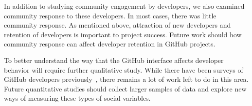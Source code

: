 \documentclass{iitthesis}
\begin{document}
In addition to studying community engagement by developers, we also examined
community response to these developers. In most cases, there was little
community response. As mentioned above, attraction of new developers and
retention of developers is important to project success. Future work should how
community response can affect developer retention in GitHub projects.

To better understand the way that the GitHub interface affects developer
behavior will require further qualitative study. While there have been surveys
of GitHub developers previously~\cite{mcdonald_performance_2013}, there remains
a lot of work left to do in this area. Future quantitative studies should
collect larger samples of data and explore new ways of measuring these types of
social variables.

\clearpage


%
%

\appendix

%
%




\end{document}
